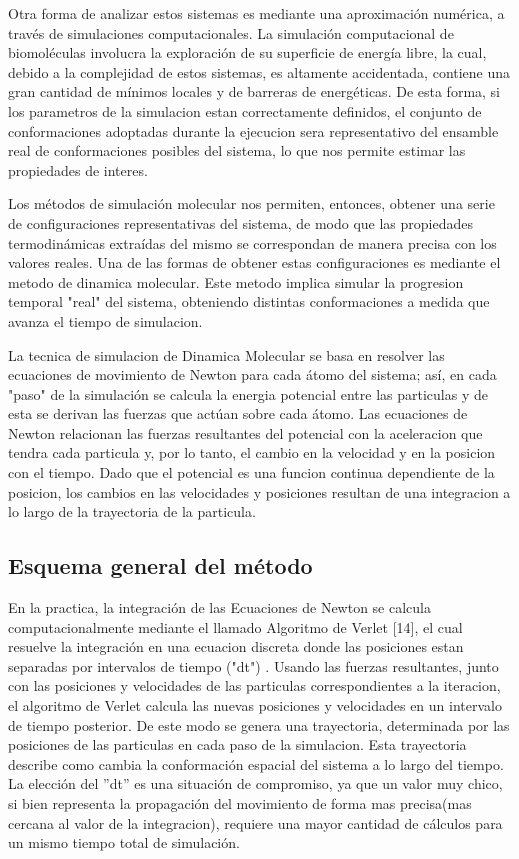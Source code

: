 \documentclass[a4paper,10pt]{report}
\begin{document}
Otra forma de analizar estos sistemas es mediante una aproximación numérica, a través de simulaciones computacionales.  	
La simulación computacional de biomoléculas involucra la exploración de su superficie de energía libre, la cual, debido a la complejidad de estos sistemas, es altamente accidentada, contiene una gran cantidad de mínimos locales y de barreras de energéticas. 
De esta forma, si los parametros de la simulacion estan correctamente definidos, el conjunto de conformaciones adoptadas durante la ejecucion sera representativo del ensamble real de conformaciones posibles del sistema, lo que nos permite estimar las propiedades de interes.

Los métodos de simulación molecular nos permiten, entonces, obtener una serie de configuraciones representativas del sistema, de modo que las propiedades termodinámicas extraídas del mismo se correspondan de manera precisa con los valores reales.
Una de las formas de obtener estas configuraciones es mediante el metodo de dinamica molecular. Este metodo implica simular la progresion temporal "real" del sistema, obteniendo distintas conformaciones a medida que avanza el tiempo de simulacion.

La tecnica de simulacion de Dinamica Molecular se basa en resolver las ecuaciones de movimiento de Newton para cada átomo del sistema; así, en cada "paso" de la simulación se calcula la energia potencial entre las particulas y de esta se derivan las fuerzas que actúan sobre cada átomo. 
Las ecuaciones de Newton relacionan las fuerzas resultantes del potencial con la aceleracion que tendra cada particula y, por lo tanto, el cambio en la velocidad y en la posicion con el tiempo. 
Dado que el potencial es una funcion continua dependiente de la posicion, los cambios en las velocidades y posiciones resultan de una integracion a lo largo de la trayectoria de la particula.


\subsection{Esquema general del método}

En la practica, la integración de las Ecuaciones de Newton se calcula computacionalmente mediante el llamado Algoritmo de Verlet [14], el cual resuelve la integración en una ecuacion discreta donde las posiciones estan separadas por intervalos de tiempo ("dt") . 
Usando las fuerzas resultantes, junto con las posiciones y velocidades de las particulas correspondientes a la iteracion, el algoritmo de Verlet calcula las nuevas posiciones y velocidades en un intervalo de tiempo posterior. De este modo se genera una trayectoria, determinada por las posiciones de las particulas en cada paso de la simulacion. Esta trayectoria describe como cambia la conformación espacial del sistema a lo largo del tiempo. 
La elección del ''dt'' es una situación de compromiso, ya que un valor muy chico, si bien representa la propagación del movimiento de forma mas precisa(mas cercana al valor de la integracion), requiere una mayor cantidad de cálculos para un mismo tiempo total de simulación. 
\end{document}
